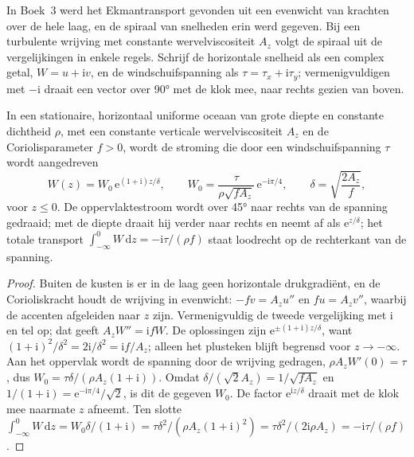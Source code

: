 In Boek~3 werd het Ekmantransport gevonden uit een evenwicht van krachten
over de hele laag, en de spiraal van snelheden erin werd gegeven. Bij een
turbulente wrijving met constante wervelviscositeit $A_z$ volgt de spiraal
uit de vergelijkingen in enkele regels. Schrijf de horizontale snelheid als een
complex getal, $W = u + \mathrm iv$, en de windschuifspanning als $\tau =
\tau_x + \mathrm i\tau_y$; vermenigvuldigen met $-\mathrm i$ draait een vector
over \ang{90} met de klok mee, naar rechts gezien van boven.

\begin{theorem}\label{thm:b3:ocean-dynamics:ekman}
In een stationaire, horizontaal uniforme oceaan van grote diepte en constante dichtheid
$\rho$, met een constante verticale wervelviscositeit $A_z$ en de Coriolisparameter
$f > 0$, wordt de stroming die door een windschuifspanning $\tau$ wordt aangedreven
\[
W(z) = W_0\,\mathrm e^{(1+\mathrm i)z/\delta},\qquad
W_0 = \frac{\tau}{\rho\sqrt{fA_z}}\,\mathrm e^{-\mathrm i\pi/4},\qquad
\delta = \sqrt{\frac{2A_z}{f}} ,
\]
voor $z \le 0$. De oppervlaktestroom wordt over \ang{45} naar rechts van de
spanning gedraaid; met de diepte draait hij verder naar rechts en neemt af als $\mathrm
e^{z/\delta}$; het totale transport $\int_{-\infty}^0 W\,\mathrm dz =
-\mathrm i\tau/(\rho f)$ staat loodrecht op de rechterkant van de spanning.
\end{theorem}

\begin{proof}
Buiten de kusten is er in de laag geen horizontale drukgradiënt,
en de Corioliskracht houdt de wrijving in evenwicht: $-fv = A_z u''$ en $fu =
A_z v''$, waarbij de accenten afgeleiden naar $z$ zijn. Vermenigvuldig de tweede
vergelijking met $\mathrm i$ en tel op; dat geeft $A_zW'' = \mathrm ifW$. De oplossingen zijn
$\mathrm e^{\pm(1+\mathrm i)z/\delta}$, want $(1+\mathrm i)^2/\delta^2 =
2\mathrm i/\delta^2 = \mathrm if/A_z$; alleen het plusteken blijft begrensd voor
$z \to -\infty$. Aan het oppervlak wordt de spanning door de wrijving gedragen,
$\rho A_zW'(0) = \tau$, dus $W_0 = \tau\delta/(\rho A_z(1+\mathrm i))$.
Omdat $\delta/(\sqrt2 A_z) = 1/\sqrt{fA_z}$ en $1/(1+\mathrm i) = \mathrm
e^{-\mathrm i\pi/4}/\sqrt2$, is dit de gegeven $W_0$. De factor
$\mathrm e^{\mathrm iz/\delta}$ draait met de klok mee naarmate $z$ afneemt. Ten slotte
$\int_{-\infty}^0 W\,\mathrm dz = W_0\delta/(1+\mathrm i) =
\tau\delta^2/(\rho A_z(1+\mathrm i)^2) = \tau\delta^2/(2\mathrm i\rho A_z)
= -\mathrm i\tau/(\rho f)$.
\end{proof}


